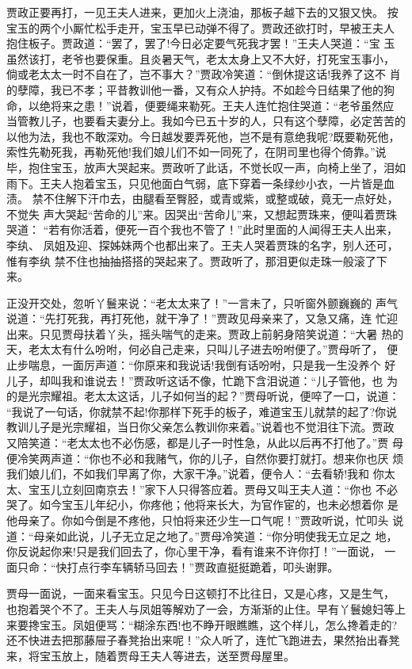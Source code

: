 贾政正要再打，一见王夫人进来，更加火上浇油，那板子越下去的又狠又快。
按宝玉的两个小厮忙松手走开，宝玉早已动弹不得了。贾政还欲打时，早被王夫人
抱住板子。贾政道：“罢了，罢了!今日必定要气死我才罢！”王夫人哭道：“宝
玉虽然该打，老爷也要保重。且炎暑天气，老太太身上又不大好，打死宝玉事小，
倘或老太太一时不自在了，岂不事大？”贾政冷笑道：“倒休提这话!我养了这不
肖的孽障，我已不孝；平昔教训他一番，又有众人护持。不如趁今日结果了他的狗
命，以绝将来之患！”说着，便要绳来勒死。王夫人连忙抱住哭道：“老爷虽然应
当管教儿子，也要看夫妻分上。我如今已五十岁的人，只有这个孽障，必定苦苦的
以他为法，我也不敢深劝。今日越发要弄死他，岂不是有意绝我呢?既要勒死他，
索性先勒死我，再勒死他!我们娘儿们不如一同死了，在阴司里也得个倚靠。”说
毕，抱住宝玉，放声大哭起来。贾政听了此话，不觉长叹一声，向椅上坐了，泪如
雨下。王夫人抱着宝玉，只见他面白气弱，底下穿着一条绿纱小衣，一片皆是血渍。
禁不住解下汗巾去，由腿看至臀胫，或青或紫，或整或破，竟无一点好处，不觉失
声大哭起“苦命的儿”来。因哭出“苦命儿”来，又想起贾珠来，便叫着贾珠哭道：
“若有你活着，便死一百个我也不管了！”此时里面的人闻得王夫人出来，李纨、
凤姐及迎、探姊妹两个也都出来了。王夫人哭着贾珠的名字，别人还可，惟有李纨
禁不住也抽抽搭搭的哭起来了。贾政听了，那泪更似走珠一般滚了下来。

正没开交处，忽听丫鬟来说：“老太太来了！”一言未了，只听窗外颤巍巍的
声气说道：“先打死我，再打死他，就干净了！”贾政见母亲来了，又急又痛，连
忙迎出来。只见贾母扶着丫头，摇头喘气的走来。贾政上前躬身陪笑说道：“大暑
热的天，老太太有什么吩咐，何必自己走来，只叫儿子进去吩咐便了。”贾母听了，
便止步喘息，一面厉声道：“你原来和我说话!我倒有话吩咐，只是我一生没养个
好儿子，却叫我和谁说去！”贾政听这话不像，忙跪下含泪说道：“儿子管他，也
为的是光宗耀祖。老太太这话，儿子如何当的起？”贾母听说，便啐了一口，说道：
“我说了一句话，你就禁不起!你那样下死手的板子，难道宝玉儿就禁的起了?你说
教训儿子是光宗耀祖，当日你父亲怎么教训你来着。”说着也不觉泪往下流。贾政
又陪笑道：“老太太也不必伤感，都是儿子一时性急，从此以后再不打他了。”贾
母便冷笑两声道：“你也不必和我赌气，你的儿子，自然你要打就打。想来你也厌
烦我们娘儿们，不如我们早离了你，大家干净。”说着，便令人：“去看轿!我和
你太太、宝玉儿立刻回南京去！”家下人只得答应着。贾母又叫王夫人道：“你也
不必哭了。如今宝玉儿年纪小，你疼他；他将来长大，为官作宦的，也未必想着你
是他母亲了。你如今倒是不疼他，只怕将来还少生一口气呢！”贾政听说，忙叩头
说道：“母亲如此说，儿子无立足之地了。”贾母冷笑道：“你分明使我无立足之
地，你反说起你来!只是我们回去了，你心里干净，看有谁来不许你打！”一面说，
一面只命：“快打点行李车辆轿马回去！”贾政直挺挺跪着，叩头谢罪。

贾母一面说，一面来看宝玉。只见今日这顿打不比往日，又是心疼，又是生气，
也抱着哭个不了。王夫人与凤姐等解劝了一会，方渐渐的止住。早有丫鬟媳妇等上
来要搀宝玉。凤姐便骂：“糊涂东西!也不睁开眼瞧瞧，这个样儿，怎么搀着走的?
还不快进去把那藤屉子春凳抬出来呢！”众人听了，连忙飞跑进去，果然抬出春凳
来，将宝玉放上，随着贾母王夫人等进去，送至贾母屋里。

